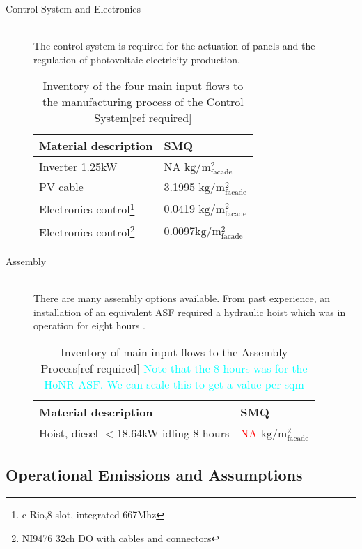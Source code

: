 \begin{description}
\item[Control System and Electronics] \hfill \\
The control system is required for the actuation of panels and the regulation of photovoltaic electricity production.\\

\begin{table}[H]
\centering
\begin{tabular}{ll}
\hline
Material description & SMQ \\ \hline
Inverter 1.25kW	 & NA ${\mathrm{kg/m^2_{facade}}}$ \\
PV cable  & 3.1995 ${\mathrm{kg/m^2_{facade}}}$\\
Electronics control\footnote{c-Rio,8-slot, integrated 667Mhz}& 0.0419 ${\mathrm{kg/m^2_{facade}}}$\\
Electronics control\footnote{NI9476 32ch DO with cables and connectors}& 0.0097${\mathrm{kg/m^2_{facade}}}$\\
\hline
\end{tabular}
\caption{Inventory of the four main input flows to the manufacturing process of the Control System[ref required]}
\label{tab:ControlInv}
\end{table}

\item[Assembly] \hfill \\
There are many assembly options available. From past experience, an installation of an equivalent ASF required a hydraulic hoist which was in operation for eight hours \cite{jayathissa2015abs}. \\

\begin{table}[H]
\centering
\begin{tabular}{ll}
\hline
Material description & SMQ \\ \hline
Hoist, diesel  ${<}$18.64kW idling 8 hours & \textcolor{red}{NA} ${\mathrm{kg/m^2_{facade}}}$ \\
\hline
\end{tabular}
\caption{Inventory of main input flows to the Assembly Process[ref required] \textcolor{cyan}{Note that the 8 hours was for the HoNR ASF. We can scale this to get a value per sqm}}
\label{tab:AssemblyInv}
\end{table}

\end{description}

\subsection{Operational Emissions and Assumptions}
\label{ch:Meth:Opp}

